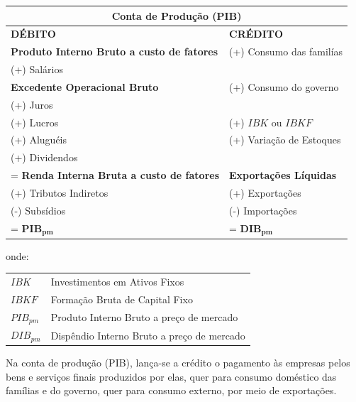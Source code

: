 \documentclass{article}\usepackage[]{graphicx}\usepackage[]{xcolor}
\makeatletter
\newenvironment{conditions}
  {\par\vspace{\abovedisplayskip}\noindent\begin{tabular}{>{$}l<{$} @{${}={}$} l}}
  {\end{tabular}\par\vspace{\belowdisplayskip}}
\makeatother
\begin{document}
\begin{table}[H]
\centering
\begin{tabular}{ |p{7cm}|p{4cm}|  }
 \hline
 \multicolumn{2}{|c|}{Conta de Produção (PIB)}\\
 \hline
 \textbf{DÉBITO}                                  &   \textbf{CRÉDITO}\\
 \hline
 \textbf{Produto Interno Bruto a custo de fatores}&   (+) Consumo das familías\\
 \hline
 (+) Salários                                     &   \\
 \hline
 \textbf{Excedente Operacional Bruto}             &   (+) Consumo do governo\\
 \hline
 (+) Juros                                        &   \\
 \hline
 (+) Lucros                                       &   (+) \(IBK\) ou \(IBKF\)\\
 \hline
 (+) Aluguéis                                     &   (+) Variação de Estoques\\
 \hline
 (+) Dividendos                                   &   \\
 \hline
 = \textbf{Renda Interna Bruta a custo de fatores}&   \textbf{Exportações Líquidas}\\
 \hline
 (+) Tributos Indiretos                           &   (+) Exportações\\
 \hline
 (-) Subsídios                                    &   (-) Importações\\
 \hline
  = \(\mathbf{PIB_{pm}}\)                         &   = \(\mathbf{DIB_{pm}}\)\\
 \hline
\end{tabular}
\end{table}

onde:

\begin{conditions}
IBK       &   Investimentos em Ativos Fixos\\
IBKF      &   Formação Bruta de Capital Fixo\\
PIB_{pm}  &   Produto Interno Bruto a preço de mercado\\
DIB_{pm}  &   Dispêndio Interno Bruto a preço de mercado\\
\end{conditions}


Na conta de produção (PIB), lança-se a crédito o pagamento às empresas pelos bens e serviços finais 
produzidos por elas, quer para consumo doméstico das famílias e do governo, quer para consumo externo, 
por meio de exportações.\par
\end{document}
